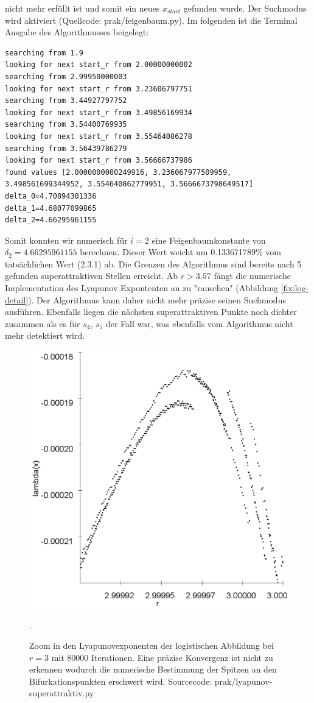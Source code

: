 \documentclass{scrartcl}
\begin{document}
nicht mehr erfüllt ist und somit ein neues $x_{start}$ gefunden wurde. Der Suchmodus wird aktiviert  (Quellcode: prak/feigenbaum.py).
Im folgenden ist die Terminal Ausgabe des Algorithmusses beigelegt:
\begin{lstlisting}
searching from 1.9
looking for next start_r from 2.00000000002
searching from 2.99950000003
looking for next start_r from 3.23606797751
searching from 3.44927797752
looking for next start_r from 3.49856169934
searching from 3.54400769935
looking for next start_r from 3.55464086278
searching from 3.56439786279
looking for next start_r from 3.56666737986
found values [2.0000000000249916, 3.236067977509959, 3.498561699344952, 3.554640862779951, 3.5666673798649517]
delta_0=4.70894301336
delta_1=4.68077099865
delta_2=4.66295961155
\end{lstlisting}
Somit konnten wir numerisch für $i=2$ eine Feigenbaumkonstante von $\delta_2=4.66295961155$ berechnen. Dieser Wert weicht um 0.133671789\% vom tatsächlichen Wert (2.3.1) ab. Die Grenzen des Algorithmus sind bereits nach 5 gefunden superattraktiven Stellen erreicht. Ab $r>3.57$ fängt die numerische Implementation des Lyapunov Expontenten an zu "rauschen" (Abbildung \ref{fix:log-detail}). Der Algorithmus kann daher nicht mehr präzise seinen Suchmodus ausführen. Ebenfalls liegen die nächsten superattraktiven Punkte noch dichter zusammen als es für $s_4$, $s_5$ der Fall war, was ebenfalls vom Algorithmus nicht mehr detektiert wird. 
\begin{figure}
\centering
\includegraphics[scale=0.20]{lya-rauschen}
\caption{Zoom in den Lyapunovexponenten der logistischen Abbildung bei $r=3$ mit 80000 Iterationen. 
Eine präzise Konvergenz ist nicht zu erkennen wodurch die numerische Bestimmung der Spitzen an den Bifurkationspunkten erschwert wird. Sourcecode: prak/lyapunov-superattraktiv.py}. 
\label{fig:lya-rauschen}
\end{figure}
\end{document}
